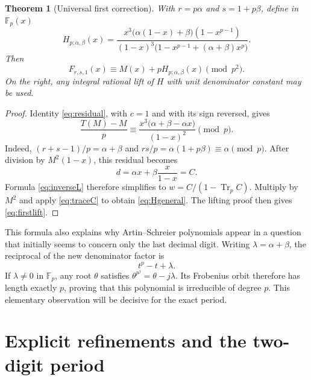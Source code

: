\documentclass[11pt,letterpaper]{article}
\newtheorem{theorem}{Theorem}[section]
\theoremstyle{definition}
\theoremstyle{remark}
\newcommand{\F}{\mathbb F}
\DeclareMathOperator{\Tr}{Tr}
\begin{document}
\begin{theorem}[Universal first correction]\label{thm:firstcorrection}
With $r=p\alpha$ and $s=1+p\beta$, define in $\F_p(x)$
\begin{equation}\label{eq:Hgeneral}
 H_{p;\alpha,\beta}(x)=
 \frac{x^3\bigl(\alpha(1-x)+\beta\bigr)(1-x^{p-1})}
 {(1-x)^3\bigl(1-x^{p-1}+(\alpha+\beta)x^p\bigr)}.
\end{equation}
Then
\begin{equation}\label{eq:firstlift}
 F_{r,s,1}(x)\equiv M(x)+pH_{p;\alpha,\beta}(x)\pmod {p^2}.
\end{equation}
On the right, any integral rational lift of $H$ with unit denominator
constant may be used.
\end{theorem}
\begin{proof}
Identity \eqref{eq:residual}, with $c=1$ and with its sign reversed,
gives
\[
 \frac{T(M)-M}{p}
 \equiv\frac{x^3\bigl(\alpha+\beta-\alpha x\bigr)}{(1-x)^2}
 \pmod p.
\]
Indeed, $(r+s-1)/p=\alpha+\beta$ and
$rs/p=\alpha(1+p\beta)\equiv\alpha\pmod p$.
After division by $M^2(1-x)$, this residual becomes
\[
 d=\alpha x+\beta\frac{x}{1-x}=C.
\]
Formula \eqref{eq:inverseL} therefore simplifies to
$w=C/(1-\Tr_p C)$.  Multiply by $M^2$ and apply
\eqref{eq:traceC} to obtain \eqref{eq:Hgeneral}.
The lifting proof then gives \eqref{eq:firstlift}.
\end{proof}

This formula also explains why Artin--Schreier polynomials appear in a
question that initially seems to concern only the last decimal digit.
Writing $\lambda=\alpha+\beta$, the reciprocal of the new denominator
factor is
\[
 t^p-t+\lambda.
\]
If $\lambda\ne0$ in $\F_p$, any root $\theta$ satisfies
$\theta^{p^j}=\theta-j\lambda$.  Its Frobenius orbit therefore has length
exactly $p$, proving that this polynomial is irreducible of degree $p$.
This elementary observation will be decisive for the exact period.

\section{Explicit refinements and the two-digit period}\label{sec:period}
\end{document}
